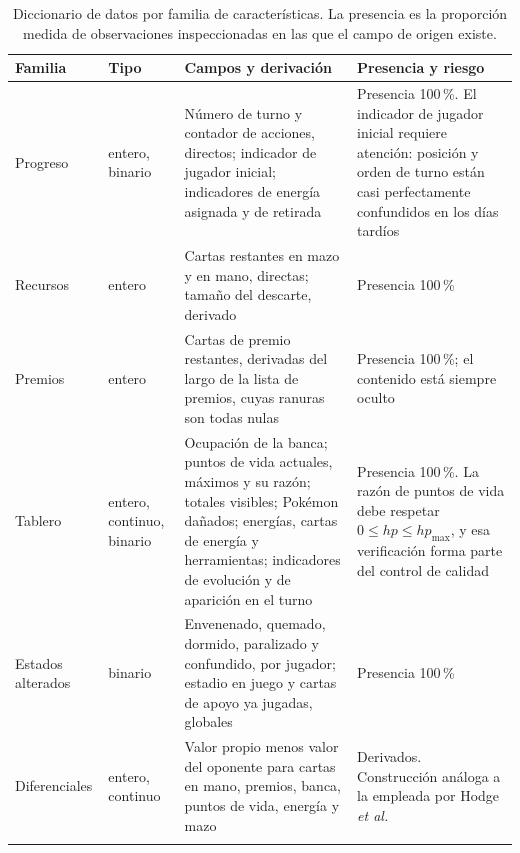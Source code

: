 \begin{table}[!t]
\centering
\caption{Diccionario de datos por familia de características. La presencia
es la proporción medida de observaciones inspeccionadas en las que el campo
de origen existe.}
\label{tab:diccionario}
\begin{threeparttable}
\footnotesize
\setlength{\tabcolsep}{4pt}
\begin{tabularx}{\textwidth}{@{}
    P{2.2cm}
    >{\centering\arraybackslash}p{1.9cm}
    W{0.80}
    W{1.20}
  @{}}
\toprule
\textbf{Familia} & \textbf{Tipo} & \textbf{Campos y derivación} &
\textbf{Presencia y riesgo}\\
\midrule

Progreso & entero, binario &
Número de turno y contador de acciones, directos; indicador de jugador
inicial; indicadores de energía asignada y de retirada &
Presencia 100\,\%. El indicador de jugador inicial requiere atención:
posición y orden de turno están casi perfectamente confundidos en los días
tardíos
\\
\addlinespace[3pt]

Recursos & entero &
Cartas restantes en mazo y en mano, directas; tamaño del descarte, derivado &
Presencia 100\,\%
\\
\addlinespace[3pt]

Premios & entero &
Cartas de premio restantes, derivadas del largo de la lista de premios,
cuyas ranuras son todas nulas &
Presencia 100\,\%; el contenido está siempre oculto
\\
\addlinespace[3pt]

Tablero & entero, continuo, binario &
Ocupación de la banca; puntos de vida actuales, máximos y su razón; totales
visibles; Pok\'emon dañados; energías, cartas de energía y herramientas;
indicadores de evolución y de aparición en el turno &
Presencia 100\,\%. La razón de puntos de vida debe respetar
$0 \leq hp \leq hp_{\max}$, y esa verificación forma parte del control de
calidad
\\
\addlinespace[3pt]

Estados alterados & binario &
Envenenado, quemado, dormido, paralizado y confundido, por jugador; estadio
en juego y cartas de apoyo ya jugadas, globales &
Presencia 100\,\%
\\
\addlinespace[3pt]

Diferenciales & entero, continuo &
Valor propio menos valor del oponente para cartas en mano, premios, banca,
puntos de vida, energía y mazo &
Derivados. Construcción análoga a la empleada por Hodge \textit{et al.}
\cite{hodge_winprediction_2021}
\\
\addlinespace[3pt]


\end{tabularx}
\end{threeparttable}
\end{table}
